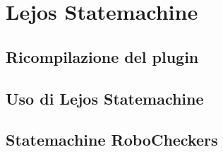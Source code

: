 \chapter{Lejos Statemachine}

\section{Ricompilazione del plugin}
\section{Uso di Lejos Statemachine}
\section{Statemachine RoboCheckers}